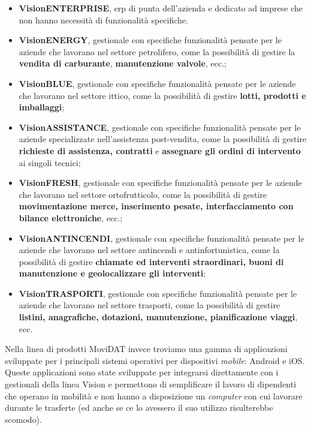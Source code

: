 \begin{itemize}
      \item \textbf{VisionENTERPRISE}, \gls{erp} di punta dell'azienda e dedicato ad imprese che non hanno necessità di funzionalità 
      specifiche.
      \item \textbf{VisionENERGY}, gestionale con specifiche funzionalità pensate per le aziende che lavorano nel settore petrolifero, 
      come la possibilità di gestire la \textbf{vendita di carburante}, \textbf{manutenzione valvole}, ecc.;
      \item \textbf{VisionBLUE}, gestionale con specifiche funzionalità pensate per le aziende che lavorano nel settore ittico, 
      come la possibilità di gestire \textbf{lotti, prodotti e imballaggi};
      \item \textbf{VisionASSISTANCE}, gestionale con specifiche funzionalità pensate per le aziende specializzate nell'assistenza post-vendita, 
      come la possibilità di gestire \textbf{richieste di assistenza, contratti} e \textbf{assegnare gli ordini di intervento} ai 
      singoli tecnici;
      \item \textbf{VisionFRESH}, gestionale con specifiche funzionalità pensate per le aziende che lavorano nel settore ortofrutticolo, 
      come la possibilità di gestire \textbf{movimentazione merce, inserimento pesate, interfacciamento con bilance elettroniche}, ecc.;
      \item \textbf{VisionANTINCENDI}, gestionale con specifiche funzionalità pensate per le aziende che lavorano nel settore antincendi e antinfortunistica, 
      come la possibilità di gestire \textbf{chiamate ed interventi straordinari, buoni di manutenzione e geolocalizzare gli interventi};
      \item \textbf{VisionTRASPORTI}, gestionale con specifiche funzionalità pensate per le aziende che lavorano nel settore trasporti, 
      come la possibilità di gestire \textbf{listini, anagrafiche, dotazioni, manutenzione, pianificazione viaggi}, ecc.
\end{itemize}
Nella linea di prodotti MoviDAT invece troviamo una gamma di applicazioni sviluppate per i principali sistemi operativi per dispositivi 
\textit{mobile}: Android e iOS. Queste applicazioni sono state sviluppate per integrarsi direttamente con i gestionali 
della linea Vision e permettono di semplificare il lavoro di dipendenti che operano in mobilità e non hanno a disposizione un 
\textit{computer} con cui lavorare durante le trasferte (ed anche se ce lo avessero il suo utilizzo risulterebbe scomodo).\\
